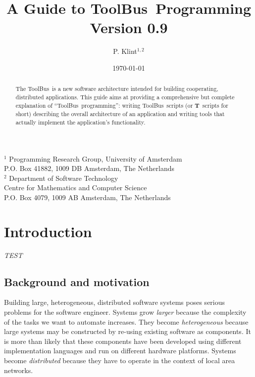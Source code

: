 \documentclass[a4,twoside,noweb]{article} %
\begin{document}
\newcommand{\TB}{{\sc ToolBus}}
\newcommand{\T}{{\bf T}}
\newcommand{\spec}[1]{{\rm #1}}
\newcommand{\script}[1]{{\tt #1}}
\newcommand{\ASFSDF}{{\sc Asf+Sdf}}
\newcommand{\ASF}{{\sc Asf}}
\newcommand{\SDF}{{\sc Sdf}}
\newcommand{\GEL}{{\sc Gel}}
\newcommand{\iter}{\,^*\,}
\newcommand{\emp}[1]{{\em #1}}
\newcommand{\txttt}[1]{{\tt #1}}

%

\title{A Guide to \TB\ Programming\\
Version 0.9}
\author{P. Klint$^{1,2}$}
\date{\today}
\maketitle
\begin{center}
       {\footnotesize $^1$ Programming Research Group, University of Amsterdam\\
        P.O. Box 41882, 1009 DB Amsterdam, The Netherlands\\
        $^2$ Department of Software Technology\\
        Centre for Mathematics and Computer Science\\
        P.O. Box 4079, 1009 AB Amsterdam, The Netherlands}
\end{center}

\begin{abstract}
The \TB\ is a new software architecture intended for building
cooperating, distributed applications.  This guide aims at providing a
comprehensive but complete explanation of ``\TB\ programming'':
writing \TB{}ripts (or \T\ scripts for short) describing the overall architecture of an
application and writing tools that actually implement the application's
functionality.

\end{abstract}
\tableofcontents

\newpage

\section{Introduction}

{\em TEST}
\subsection{Background and motivation}
Building large, heterogeneous, distributed software systems poses
serious problems for the software engineer.  Systems grow {\em larger}
because the complexity of the tasks we want to automate
increases.  They become {\em heterogeneous} because large systems may be
constructed by re-using existing software as components.
It is more than likely that these components have been developed
using different implementation languages and run on different
hardware platforms.
Systems become {\em distributed} because they have to operate
in the context of local area networks.
\end{document}
